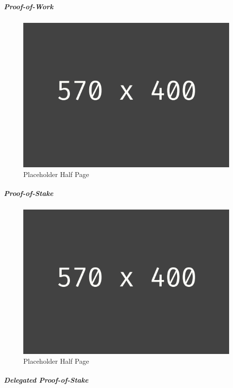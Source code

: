 \subparagraph{Proof-of-Work}
\begin{figure}[h!]
	\centering
	\includegraphics[width=1.0\linewidth]{pictures/placeholder_half_page}
	\caption[Placeholder Half Page]{Placeholder Half Page}
	\label{fig:placeholder_half_page}
\end{figure}

\subparagraph{Proof-of-Stake}
\begin{figure}[h!]
	\centering
	\includegraphics[width=1.0\linewidth]{pictures/placeholder_half_page}
	\caption[Placeholder Half Page]{Placeholder Half Page}
	\label{fig:placeholder_half_page}
\end{figure}

\subparagraph{Delegated Proof-of-Stake}
